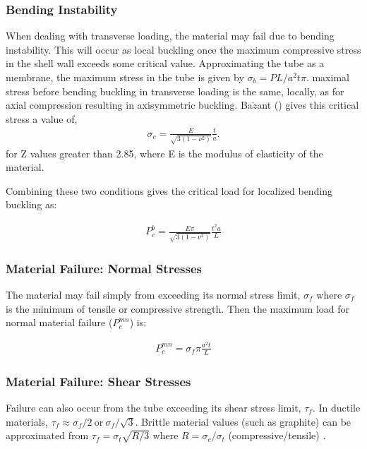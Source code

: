 \documentclass{report}
\begin{document}
\subsubsection{Bending Instability}

When dealing with transverse loading, the material may fail due to bending instability. This will occur as local buckling once the maximum compressive stress in the shell wall exceeds some critical value. Approximating the tube as a membrane, the maximum stress in the tube is given by $\sigma_{b} = PL/a^2t\pi$. maximal stress before bending buckling in transverse loading is the same, locally, as for axial compression resulting in axisymmetric buckling. Ba$\check{z}$ant (\cite{Bazant1991}) gives this critical stress a value of,
\begin{eqnarray}
\sigma_{c}=\frac{E}{\sqrt{3(1-\nu^2)}}\frac{t}{a}.
\end{eqnarray}
for Z values greater than 2.85, where E is the modulus of elasticity of the material.

Combining these two conditions gives the critical load for localized bending buckling as:

\begin{eqnarray}
P_{c}^{b} = \frac{E \pi}{\sqrt{3(1-\nu^2)}}\frac{t^2a}{L}
\end{eqnarray}

\subsubsection{Material Failure: Normal Stresses}

The material may fail simply from exceeding its normal stress limit, $\sigma_{f}$ where $\sigma_{f}$ is the minimum of tensile or compressive strength. Then the maximum load for normal material failure ($P_{c}^{mn}$) is:

\begin{eqnarray}
P_{c}^{mn} = \sigma_{f} \pi \frac{a^2t}{L}
\end{eqnarray}


\subsubsection{Material Failure: Shear Stresses}

Failure can also occur from the tube exceeding its shear stress limit, $\tau_{f}$. In ductile materials, $\tau_{f} \approx \sigma_{f}/2 \ \text{or} \ \sigma_{f}/\sqrt{3}$. Brittle material values (such as graphite) can be approximated from $\tau_{f} = \sigma_{t}\sqrt{R/3} $ where $R = \sigma_{c}/\sigma_{t}$ (compressive/tensile) \cite{Ely1965}.
\end{document}
